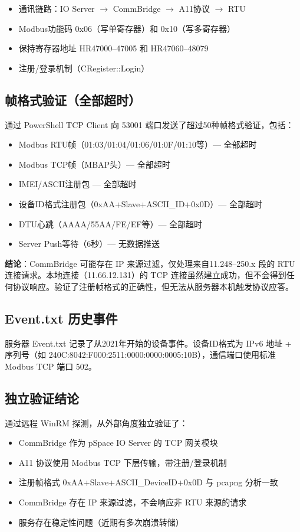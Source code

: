 \documentclass[12pt,a4paper]{ctexart}
\begin{document}
\begin{itemize}[leftmargin=*]
\item 通讯链路：IO Server $\rightarrow$ CommBridge $\rightarrow$ A11协议 $\rightarrow$ RTU
\item Modbus功能码 0x06（写单寄存器）和 0x10（写多寄存器）
\item 保持寄存器地址 HR47000--47005 和 HR47060--48079
\item 注册/登录机制（CRegister::Login）
\end{itemize}

\subsection{帧格式验证（全部超时）}

通过 PowerShell TCP Client 向 53001 端口发送了超过50种帧格式验证，包括：

\begin{itemize}[leftmargin=*]
\item Modbus RTU帧（01:03/01:04/01:06/01:0F/01:10等）— 全部超时
\item Modbus TCP帧（MBAP头）— 全部超时
\item IMEI/ASCII注册包 — 全部超时
\item 设备ID格式注册包（0xAA+Slave+ASCII\_ID+0x0D）— 全部超时
\item DTU心跳（AAAA/55AA/FE/EF等）— 全部超时
\item Server Push等待（6秒）— 无数据推送
\end{itemize}

\textbf{结论}：CommBridge 可能存在 IP 来源过滤，仅处理来自11.248--250.x 段的 RTU 连接请求。本地连接（11.66.12.131）的 TCP 连接虽然建立成功，但不会得到任何协议响应。验证了注册帧格式的正确性，但无法从服务器本机触发协议应答。

\subsection{Event.txt 历史事件}

服务器 Event.txt 记录了从2021年开始的设备事件。设备ID格式为 IPv6 地址 + 序列号（如 240C:8042:F000:2511:0000:0000:0005:10B），通信端口使用标准 Modbus TCP 端口 502。

\subsection{独立验证结论}

通过远程 WinRM 探测，从外部角度独立验证了：

\begin{itemize}[leftmargin=*]
\item CommBridge 作为 pSpace IO Server 的 TCP 网关模块
\item A11 协议使用 Modbus TCP 下层传输，带注册/登录机制
\item 注册帧格式 0xAA+Slave+ASCII\_DeviceID+0x0D 与 pcapng 分析一致
\item CommBridge 存在 IP 来源过滤，不会响应非 RTU 来源的请求
\item 服务存在稳定性问题（近期有多次崩溃转储）
\end{itemize}
\end{document}

